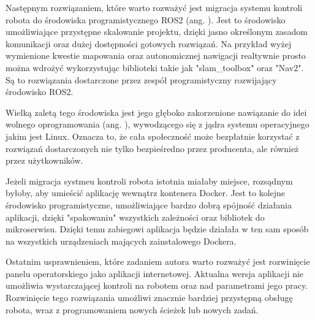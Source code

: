 \hspace{lcm}
Następnym rozwiązaniem, które warto rozważyć jest migracja systemu kontroli robota do środowiska programistycznego ROS2 (ang. ). Jest to środowisko umożliwiające przystępne skalowanie projektu, dzięki jasno określonym zasadom komunikacji oraz dużej dostępności gotowych rozwiązań. Na przykład wyżej wymienione kwestie mapowania oraz autonomicznej nawigacji realtywnie prosto można wdrożyć wykorzystując biblioteki takie jak "slam\_toolbox" oraz "Nav2". Są to rozwiązania dostarczone przez zespół programistyczny rozwijający środowisko ROS2. 

Wielką zaletą tego środowiska jest jego głęboko zakorzenione nawiązanie do idei wolnego oprogramowania (ang. ), wywodzącego się z jądra systemu operacyjnego jakim jest Linux. Oznacza to, że cała społeczność może bezpłatnie korzystać z rozwiązań dostarczonych nie tylko bezpieśredno przez producenta, ale również przez użytkowników. 

Jeżeli migracja systmeu kontroli robota istotnia miałaby miejsce, rozsądnym byłoby, aby umieścić aplikację wewnątrz kontenera Docker. Jest to kolejne środowisko programistyczne, umożliwiające bardzo dobrą spójność działania aplikacji, dzięki "spakowaniu" wszystkich zależności oraz bibliotek do mikroserwisu. Dzięki temu zabiegowi aplikacja będzie działała w ten sam sposób na wszystkich urządzeniach mających zainstalowego Dockera. 

\hspace{lcm}

Ostatnim usprawnieniem, które zadaniem autora warto rozważyć jest rozwinięcie panelu operatorskiego jako aplikacji internetowej. Aktualna wersja aplikacji nie umożliwia wystarczającej kontroli na robotem oraz nad parametrami jego pracy. Rozwinięcie tego rozwiązania umożliwi znacznie bardziej przystępną obsługę robota, wraz z programowaniem nowych ścieżek lub nowych zadań.
